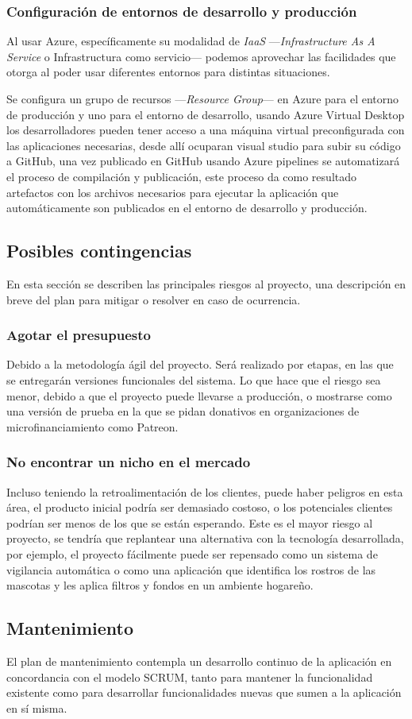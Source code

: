 \subsubsection{Configuración de entornos de desarrollo y producción}

Al usar Azure, específicamente su modalidad de \textit{IaaS} —\textit{Infrastructure As A Service} o Infrastructura como servicio— podemos aprovechar las facilidades que otorga al poder usar diferentes entornos para distintas situaciones. 

Se configura un grupo de recursos —\textit{Resource Group}— en Azure para el entorno de producción y uno para el entorno de desarrollo, usando Azure Virtual Desktop los desarrolladores pueden tener acceso a una máquina virtual preconfigurada con las aplicaciones necesarias, desde allí ocuparan visual studio para subir su código a GitHub, una vez publicado en GitHub usando Azure pipelines se automatizará el proceso de compilación y publicación, este proceso da como resultado artefactos con los archivos necesarios para ejecutar la aplicación que automáticamente son publicados en el entorno de desarrollo y producción.

\subsection{Posibles contingencias}

En esta sección se describen las principales riesgos al proyecto, una descripción en breve del plan para mitigar o resolver en caso de ocurrencia.

\subsubsection{Agotar el presupuesto}

Debido a la metodología ágil del proyecto. Será realizado por etapas, en las que se entregarán versiones funcionales del sistema. Lo que hace que el riesgo sea menor, debido a que el proyecto puede llevarse a producción, o mostrarse como una versión de prueba en la que se pidan donativos en organizaciones de microfinanciamiento como Patreon.


\subsubsection{No encontrar un nicho en el mercado}

Incluso teniendo la retroalimentación de los clientes, puede haber peligros en esta área, el producto inicial podría ser demasiado costoso, o los potenciales clientes podrían ser menos de los que se están esperando. Este es el mayor riesgo al proyecto, se tendría que replantear una alternativa con la tecnología desarrollada, por ejemplo, el proyecto fácilmente puede ser repensado como un sistema de vigilancia automática o como una aplicación que identifica los rostros de las mascotas y les aplica filtros y fondos en un ambiente hogareño.



\subsection{Mantenimiento}

El plan de mantenimiento contempla un desarrollo continuo de la aplicación en concordancia con el modelo SCRUM, tanto para mantener la funcionalidad existente como para desarrollar funcionalidades nuevas que sumen a la aplicación en sí misma.